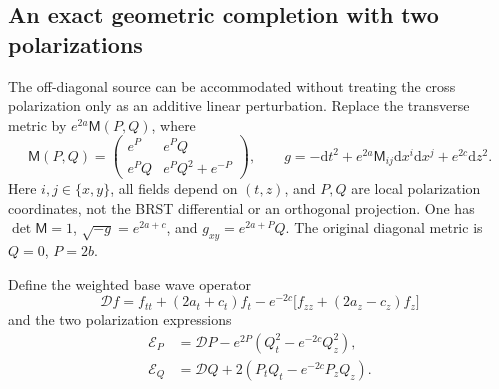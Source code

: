 \documentclass[11pt,a4paper,oneside]{book}
\theoremstyle{plain}
\theoremstyle{definition}
\theoremstyle{remark}
\newcommand{\dd}{\mathrm d}
\begin{document}
\subsection{An exact geometric completion with two polarizations}
\label{sec:two-polarizations}
The off-diagonal source can be accommodated without treating the cross
polarization only as an additive linear perturbation.  Replace the
transverse metric by $e^{2a}\mathsf M(P,Q)$, where
\begin{equation}
 \mathsf M(P,Q)=
 \begin{pmatrix}
 e^P&e^P Q\\ e^P Q&e^P Q^2+e^{-P}
 \end{pmatrix},\qquad
 g=-\dd t^2+e^{2a}\mathsf M_{ij}\dd x^i\dd x^j+e^{2c}\dd z^2.
 \label{eq:two-polarization-metric}
\end{equation}
Here $i,j\in\{x,y\}$, all fields depend on $(t,z)$, and $P,Q$ are local
polarization coordinates, not the BRST differential or an orthogonal
projection.  One has $\det\mathsf M=1$, $\sqrt{-g}=e^{2a+c}$, and
$g_{xy}=e^{2a+P}Q$.  The original diagonal metric is $Q=0$, $P=2b$.

Define the weighted base wave operator
\begin{equation}
 \mathscr Df=f_{tt}+(2a_t+c_t)f_t
 -e^{-2c}\bigl[f_{zz}+(2a_z-c_z)f_z\bigr]
 \label{eq:polarization-base-operator}
\end{equation}
and the two polarization expressions
\begin{align}
 \mathcal E_P&=\mathscr DP-e^{2P}(Q_t^2-e^{-2c}Q_z^2),\label{eq:polarization-P}\\
 \mathcal E_Q&=\mathscr DQ+2(P_tQ_t-e^{-2c}P_zQ_z).
 \label{eq:polarization-Q}
\end{align}
\end{document}
